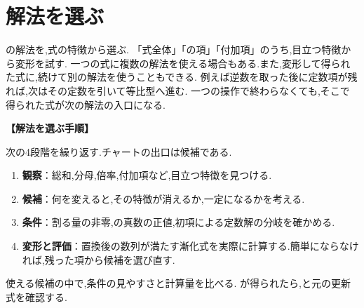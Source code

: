 
\section{解法を選ぶ}\label{節：解法の決定}

  の解法を,式の特徴から選ぶ.
  「式全体」「の項」「付加項」のうち,目立つ特徴から変形を試す.
  一つの式に複数の解法を使える場合もある.また,変形して得られた式に,続けて別の解法を使うこともできる.
  例えば逆数を取った後に定数項が残れば,次はその定数を引いて等比型へ進む.
  一つの操作で終わらなくても,そこで得られた式が次の解法の入口になる.

  \noindent\textbf{【解法を選ぶ手順】}\par
  次の4段階を繰り返す.チャートの出口は候補である.
  \begin{enumerate}
    \item \textbf{観察}：総和,分母,倍率,付加項など,目立つ特徴を見つける.
    \item \textbf{候補}：何を変えると,その特徴が消えるか,一定になるかを考える.
    \item \textbf{条件}：割る量の非零,の真数の正値,初項による定数解の分岐を確かめる.
    \item \textbf{変形と評価}：置換後の数列が満たす漸化式を実際に計算する.簡単にならなければ,残った項から候補を選び直す.
  \end{enumerate}
  使える候補の中で,条件の見やすさと計算量を比べる.
  が得られたら,と元の更新式を確認する.
  \BookFigFlowchart

